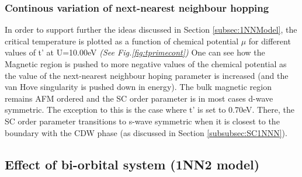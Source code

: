 \documentclass[12pt]{article}
\begin{document}
\newpage

\subsubsection{Continous variation of next-nearest neighbour hopping}

In order to support further the ideas discussed in Section \ref{subsec:1NNModel}, the critical temperature
is plotted as a function of chemical potential $\mu$ for different values of t' at U=10.00eV \textit{(See Fig.\ref{fig:tprimecont})}
One can see how the Magnetic region is pushed to more negative values of the chemical potential as the value of the next-nearest 
neighbour hoping parameter is increased (and the van Hove singularity is pushed down in energy). The bulk magnetic
region remains AFM ordered and the SC order parameter is in most cases d-wave symmetric. The exception to this is the case where
t' is set to 0.70eV. There, the SC order parameter transitions to s-wave symmetric when it is closest to the boundary 
with the CDW phase (as discussed in Section \ref{subsubsec:SC1NNN}).

\subsection{Effect of bi-orbital system (1NN2 model)}
\label{subsec:1NN2Model}
\end{document}
